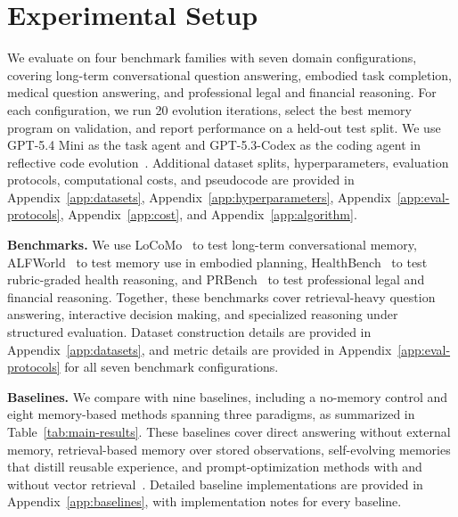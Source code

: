 \section{Experimental Setup}
\label{sec:experimental-setup}

We evaluate \sysname{} on four benchmark families with seven domain configurations, covering long-term conversational question answering, embodied task completion, medical question answering, and professional legal and financial reasoning.
For each configuration, we run 20 evolution iterations, select the best memory program on validation, and report performance on a held-out test split.
We use GPT-5.4 Mini as the task agent and GPT-5.3-Codex as the coding agent in reflective code evolution~\citep{openai2026gpt54mini,openai2026gpt53codex}.
Additional dataset splits, hyperparameters, evaluation protocols, computational costs, and pseudocode are provided in Appendix~\ref{app:datasets}, Appendix~\ref{app:hyperparameters}, Appendix~\ref{app:eval-protocols}, Appendix~\ref{app:cost}, and Appendix~\ref{app:algorithm}.

\noindent\textbf{Benchmarks.}
We use LoCoMo~\citep{locomo} to test long-term conversational memory, ALFWorld~\citep{alfworld} to test memory use in embodied planning, HealthBench~\citep{healthbench} to test rubric-graded health reasoning, and PRBench~\citep{prbench} to test professional legal and financial reasoning.
Together, these benchmarks cover retrieval-heavy question answering, interactive decision making, and specialized reasoning under structured evaluation.
Dataset construction details are provided in Appendix~\ref{app:datasets}, and metric details are provided in Appendix~\ref{app:eval-protocols} for all seven benchmark configurations.

\noindent\textbf{Baselines.}
We compare \sysname{} with nine baselines, including a no-memory control and eight memory-based methods spanning three paradigms, as summarized in Table~\ref{tab:main-results}.
These baselines cover direct answering without external memory, retrieval-based memory over stored observations, self-evolving memories that distill reusable experience, and prompt-optimization methods with and without vector retrieval~\citep{rag,alma,ouyang2025reasoningbank,gepa}.
Detailed baseline implementations are provided in Appendix~\ref{app:baselines}, with implementation notes for every baseline.
